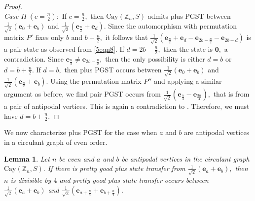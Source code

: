 \documentclass[12pt,a4paper]{article}
\newtheorem{lem}{Lemma}
\def \e {{\bf e}}
\def \e {{\mathbf e}}
\newcommand{\ob}[1]{\left(#1\right)}
\begin{document}
\begin{proof}
 \\\textit{Case II} $(c=\frac{n}{2}):$ If $c=\frac{n}{2},$ then $\text{Cay}(\mathbb{Z}_n, S)$  admits plus PGST between $\frac{1}{\sqrt{2}}\ob{\e_0+\e_b}$ and $\frac{1}{\sqrt{2}}\ob{\e_\frac{n}{2}+\e_d}.$ Since the automorphism with permutation matrix $P'$ fixes only $b$ and $b+\frac{n}{2},$ it follows that $\frac{1}{\sqrt{2}}\ob{\e_\frac{n}{2}+\e_d-\e_{2b-\frac{n}{2}}-\e_{2b-d}}$ is a pair state as observed from \eqref{5eqn8}. If  $d= 2b-\frac{n}{2},$ then  the state is $\mathbf{0},$ a contradiction. Since $\e_\frac{n}{2}\neq \e_{2b-\frac{n}{2}},$ then the only possibility is either $d=b$ or $d= b+\frac{n}{2}.$ If $d=b,$ then plus PGST occurs between $\frac{1}{\sqrt{2}}\ob{\e_0+\e_b}$ and $\frac{1}{\sqrt{2}}\ob{\e_\frac{n}{2}+\e_b}.$ Using the permutation matrix $P''$ and applying a similar argument as before, we find pair PGST occurs from $\frac{1}{\sqrt{2}}\ob{\e_\frac{n}{4}-\e_\frac{3n}{4}},$ that is from a pair of antipodal vertices. This is again a contradiction to \cite[Lemma 1]{pal10}. Therefore, we must have $d=b+\frac{n}{2}.$
  \end{proof} 


We now characterize plus PGST for the case when 
$a$ and 
$b$ are antipodal vertices in a circulant graph of even order.
\begin{lem}\label{5l10}
    Let $n$ be even and $a$ and $b$ be antipodal vertices in the circulant graph $\text{Cay}(\mathbb{Z}_n, S).$ If there is pretty good plus state transfer from $\frac{1}{\sqrt{2}}\ob{\e_a+\e_b},$ then $n$ is divisible by $4$ and pretty good plus state transfer occurs between $\frac{1}{\sqrt{2}}\ob{\e_a+\e_b}$ and $\frac{1}{\sqrt{2}}\ob{\e_{a+\frac{n}{4}}+\e_{b+\frac{n}{4}}}.$  
\end{lem}
\end{document}
